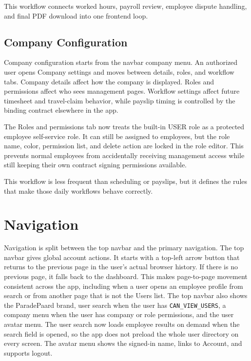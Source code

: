 \documentclass[11pt]{article}
\newcommand{\code}[1]{\nolinkurl{#1}}
\begin{document}
This workflow connects worked hours, payroll review, employee dispute handling, and final PDF download into one frontend loop.

\subsection{Company Configuration}

Company configuration starts from the navbar company menu. An authorized user opens Company settings and moves between details, roles, and workflow tabs. Company details affect how the company is displayed. Roles and permissions affect who sees management pages. Workflow settings affect future timesheet and travel-claim behavior, while payslip timing is controlled by the binding contract elsewhere in the app.

The Roles and permissions tab now treats the built-in USER role as a protected employee self-service role. It can still be assigned to employees, but the role name, color, permission list, and delete action are locked in the role editor. This prevents normal employees from accidentally receiving management access while still keeping their own contract signing permissions available.

This workflow is less frequent than scheduling or payslips, but it defines the rules that make those daily workflows behave correctly.

\section{Navigation}

Navigation is split between the top navbar and the primary navigation. The top navbar gives global account actions. It starts with a top-left arrow button that returns to the previous page in the user's actual browser history. If there is no previous page, it falls back to the dashboard. This makes page-to-page movement consistent across the app, including when a user opens an employee profile from search or from another page that is not the Users list. The top navbar also shows the ParadePaard brand, user search when the user has \code{CAN_VIEW_USERS}, a company menu when the user has company or role permissions, and the user avatar menu. The user search now loads employee results on demand when the search field is opened, so the app does not preload the whole user directory on every screen. The avatar menu shows the signed-in name, links to Account, and supports logout.
\end{document}
